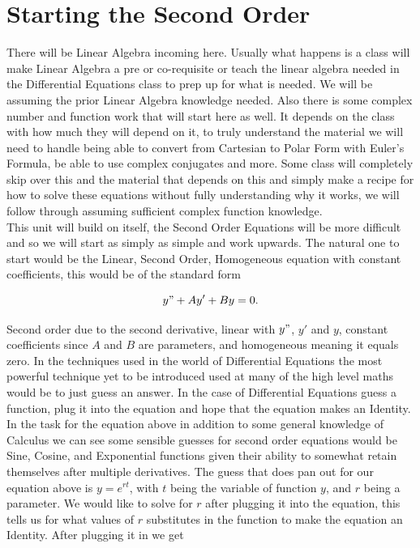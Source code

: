 \documentclass[12pt]{article}
\begin{document}
\pagebreak

\section{Starting the Second Order}

There will be Linear Algebra incoming here. Usually what happens is a class will make Linear Algebra a pre or co-requisite or teach the linear algebra needed in the Differential Equations class to prep up for what is needed. We will be assuming the prior Linear Algebra knowledge needed. Also there is some complex number and function work that will start here as well. It depends on the class with how much they will depend on it, to truly understand the material we will need to handle being able to convert from Cartesian to Polar Form with Euler's Formula, be able to use complex conjugates and more. Some class will completely skip over this and the material that depends on this and simply make a recipe for how to solve these equations without fully understanding why it works, we will follow through assuming sufficient complex function knowledge. \\ 

This unit will build on itself, the Second Order Equations will be more difficult and so we will start as simply as simple and work upwards. The natural one to start would be the Linear, Second Order, Homogeneous equation with constant coefficients, this would be of the standard form

\begin{equation*}
    y" + Ay' + By=0.
\end{equation*}

Second order due to the second derivative, linear with $y"$, $y'$ and $y$, constant coefficients since $A$ and $B$ are parameters, and homogeneous meaning it equals zero. In the techniques used in the world of Differential Equations the most powerful technique yet to be introduced used at many of the high level maths would be to just guess an answer. In the case of Differential Equations guess a function, plug it into the equation and hope that the equation makes an Identity. \\

In the task for the equation above in addition to some general knowledge of Calculus we can see some sensible guesses for second order equations would be Sine, Cosine, and Exponential functions given their ability to somewhat retain themselves after multiple derivatives. The guess that does pan out for our equation above is $y=e^{rt}$, with $t$ being the variable of function $y$, and $r$ being a parameter. We would like to solve for $r$ after plugging it into the equation, this tells us for what values of $r$ substitutes in the function to make the equation an Identity. After plugging it in we get
\end{document}
